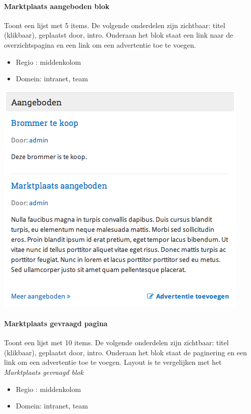 \paragraph{Marktplaats aangeboden blok}

Toont een lijst met 5 items. De volgende onderdelen zijn zichtbaar: titel (klikbaar), geplaatst door, intro. Onderaan het blok staat een link naar de overzichtspagina en een link om een advertentie toe te voegen.

\begin{itemize}
\item Regio : middenkolom
\item Domein: intranet, team
\end{itemize}

\begin{center}
	\includegraphics[scale=0.5]{img/blokken/marktplaatsaangeboden.png}
\end{center}

\paragraph{Marktplaats gevraagd pagina}

Toont een lijst met 10 items. De volgende onderdelen zijn zichtbaar: titel (klikbaar), geplaatst door, intro. Onderaan het blok staat de paginering en een link om een advertentie toe te voegen. Layout is te vergelijken met het \emph{Marktplaats gevraagd blok}

\begin{itemize}
\item Regio : middenkolom
\item Domein: intranet, team
\end{itemize}

